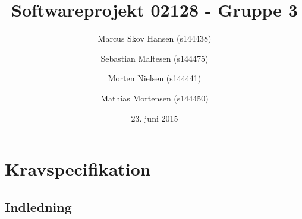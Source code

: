 \documentclass[a4paper]{article}
\begin{document}
\title{Softwareprojekt 02128 - Gruppe 3}

\author{Marcus Skov Hansen (s144438) \and Sebastian Maltesen (s144475) \and Morten Nielsen (s144441) \and Mathias Mortensen (s144450)}
\date{23. juni 2015}

\maketitle

\tableofcontents

\section{Kravspecifikation}
\subsection{Indledning}
\end{document}
